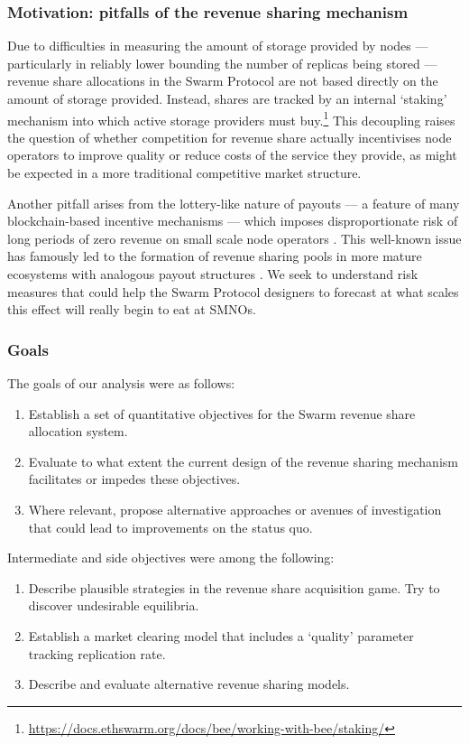 \subsubsection{Motivation: pitfalls of the revenue sharing mechanism}
\label{section:pitfalls}
%
Due to difficulties in measuring the amount of storage provided by nodes --- particularly in reliably lower bounding the number of replicas being stored --- revenue share allocations in the Swarm Protocol are not based directly on the amount of storage provided.
%
Instead, shares are tracked by an internal `staking' mechanism into which active storage providers must buy.\footnote{\url{https://docs.ethswarm.org/docs/bee/working-with-bee/staking/}}
%
This decoupling raises the question of whether competition for revenue share actually incentivises node operators to improve quality or reduce costs of the service they provide, as might be expected in a more traditional competitive market structure.

Another pitfall arises from the lottery-like nature of payouts --- a feature of many blockchain-based incentive mechanisms --- which imposes disproportionate risk of long periods of zero revenue on small scale node operators \cite{albrecher2022blockchain}.
%
This well-known issue has famously led to the formation of revenue sharing pools in more mature ecosystems with analogous payout structures \cite{rosenfeld2011analysis}.
%
We seek to understand risk measures that could help the Swarm Protocol designers to forecast at what scales this effect will really begin to eat at SMNOs.

\subsubsection{Goals}

The goals of our analysis were as follows:
%
\begin{enumerate}
  \item 
    Establish a set of quantitative objectives for the Swarm revenue share allocation system.

  \item 
    Evaluate to what extent the current design of the revenue sharing mechanism facilitates or impedes these objectives.

  \item 
    Where relevant, propose alternative approaches or avenues of investigation that could lead to improvements on the status quo.
\end{enumerate}
%
Intermediate and side objectives were among the following:
%
\begin{enumerate}[resume]
  \item 
    Describe plausible strategies in the revenue share acquisition game. Try to discover undesirable equilibria.
  
  \item 
    Establish a market clearing model that includes a `quality' parameter tracking replication rate.
  
  \item 
    Describe and evaluate alternative revenue sharing models.

\end{enumerate}

